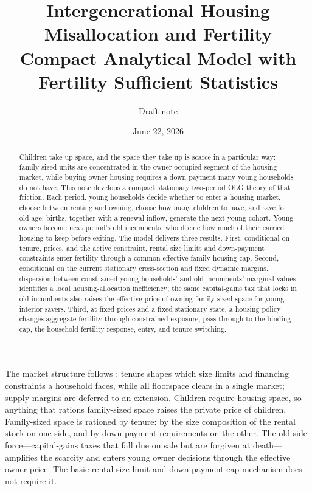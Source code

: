 \documentclass[11pt]{article}
\title{Intergenerational Housing Misallocation and Fertility\\[-0.15em]
\large Compact Analytical Model with Fertility Sufficient Statistics}
\author{Draft note}
\date{June 22, 2026}
\newcommand{\1}{\mathbf 1}
\begin{document}
\maketitle

\begin{abstract}
Children take up space, and the space they take up is scarce in a particular way: family-sized units are concentrated in the owner-occupied segment of the housing market, while buying owner housing requires a down payment many young households do not have. This note develops a compact stationary two-period OLG theory of that friction. Each period, young households decide whether to enter a housing market, choose between renting and owning, choose how many children to have, and save for old age; births, together with a renewal inflow, generate the next young cohort. Young owners become next period's old incumbents, who decide how much of their carried housing to keep before exiting. The model delivers three results. First, conditional on tenure, prices, and the active constraint, rental size limits and down-payment constraints enter fertility through a common effective family-housing cap. Second, conditional on the current stationary cross-section and fixed dynamic margins, dispersion between constrained young households' and old incumbents' marginal values identifies a local housing-allocation inefficiency; the same capital-gains tax that locks in old incumbents also raises the effective price of owning family-sized space for young interior savers. Third, at fixed prices and a fixed stationary state, a housing policy changes aggregate fertility through constrained exposure, pass-through to the binding cap, the household fertility response, entry, and tenure switching.
\end{abstract}

The market structure follows \citet{coven2024}: tenure shapes which size limits and financing constraints a household faces, while all floorspace clears in a single market; supply margins are deferred to an extension. Children require housing space, so anything that rations family-sized space raises the private price of children. Family-sized space is rationed by tenure: by the size composition of the rental stock on one side, and by down-payment requirements on the other. The old-side force---capital-gains taxes that fall due on sale but are forgiven at death---amplifies the scarcity and enters young owner decisions through the effective owner price. The basic rental-size-limit and down-payment cap mechanism does not require it.
\end{document}
